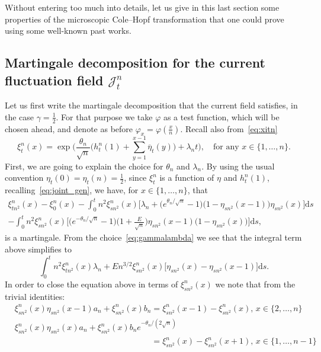 \documentclass[10pt]{amsart}
\theoremstyle{definition}\newtheorem{defi}[theo]{Definition}\newtheorem{rema}[theo]{Remark}\newtheorem{exam}[theo]{Example}\newtheorem{exem}[theo]{Example}\newtheorem{nota}[theo]{Notation}
\newcommand{\mc}[1]{{\mathcal #1}}
\renewcommand{\mc}[1]{{\mathcal #1}}
\renewcommand{\bar}{\overline}
\newcommand*{\dd}{\mathrm{d}}
\newcommand*{\ds}{\dd s}
\renewcommand{\tfrac}{\frac}
\begin{document}
Without entering too much into details, let us give in this last section some properties of the microscopic Cole--Hopf transformation that one could prove using some well-known past works.

\subsection{Martingale decomposition for the current fluctuation field \texorpdfstring{$\mc J_t^n$}{Jtn}} \label{sec:appCH}

Let us first write the martingale decomposition that the current field satisfies, in the case $\gamma=\frac12$. For that purpose we take $\varphi$ as a test function, which will be chosen ahead, and denote as before $\varphi_x=\varphi(\frac x n)$. Recall also from~\eqref{eq:xitn}
\[
\xi_t^n(x) = \exp\bigg(\frac{\theta_n}{\sqrt n} \bigg(h_t^n(1) + \sum_{y=1}^{x-1} \bar\eta_{t}(y)\bigg)+\lambda_n t \bigg), \quad \text{for any } x \in \{1,\dots,n\}.
\]
First, we are going to explain the choice for $\theta_n$ and $\lambda_n$. By using the usual convention $\eta_{t}(0)=\eta_{t}(n)=\frac12$, since $\xi_t^n$ is a function of $\eta$ and $h_t^n(1)$, recalling~\eqref{eq:joint_gen}, we have, for $x \in \{1,\dots,n\}$, that
\begin{multline*}
\xi_{{tn^2}}^n(x) -\xi_{{0}}^n(x)-\int_0^t n^2\xi_{{sn^2}}^n(x)\Big[\lambda_n + \big(e^{\theta_n/\sqrt n}-1\big)\big(1-\eta_{sn^2}(x-1)\big)\eta_{sn^2}(x) \Big]\ds\\
- \int_0^t n^2\xi_{{sn^2}}^n(x)\bigg[\big(e^{-\theta_n/\sqrt n}-1\big)\bigg(1+\tfrac{E}{\sqrt n}\bigg)\eta_{sn^2}(x-1)\big(1-\eta_{sn^2}(x)\big)\bigg]\ds,
\end{multline*}
is a martingale. From the choice~\eqref{eq:gammalambda} we see that the integral term above simplifies to
\begin{equation}\label{eq:mart_dec_CH}
\int_0^t n^2\xi_{{tn^2}}^n(x) \lambda_n+En^{3/2}\xi_{{sn^2}}^n(x)\big[\eta_{sn^2}(x)-\eta_{sn^2}(x-1)\big] \ds.
\end{equation}
In order to close the equation above in terms of $\xi_{{sn^2}}^n(x)$ we note that from the trivial identities:
\begin{equation}\label{eq:trivial_id}
\begin{split}
&\xi_{{sn^2}}^n(x)\eta_{sn^2}(x-1)a_n+\xi_{{sn^2}}^n(x){b_n}=\xi_{{sn^2}}^n(x-1)-\xi_{{sn^2}}^n(x),\, x \in \{2,\dots, n\}\\[0.5em]
&\xi_{sn^2}^n(x)\eta_{sn^2}(x)a_n+\xi_{{sn^2}}^n(x){b_ne^{-\theta_n/(2\sqrt n)}}\\[-0.5em]
&\phantom{\xi_{{sn^2}}^n(x)\eta_{sn^2}(x-1)a_n+\xi_{{sn^2}}^n(x){b_n}}=\xi_{{sn^2}}^n(x)-\xi_{{sn^2}}^n(x+1), \, x \in \{1,\dots, n-1\}
\end{split}
\end{equation}
\end{document}
